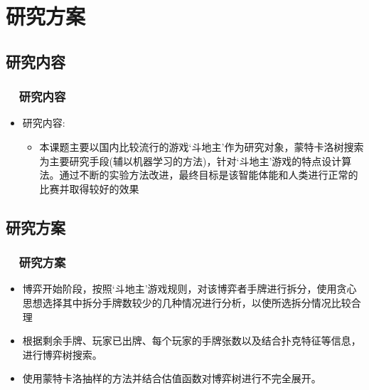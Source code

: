 \documentclass[11pt, CJK]{beamer}
\begin{document}
	\title[硕士中期检查答辩]{}
	
	\author[彭啟文]{(中期检查答辩报告){\vskip 23pt}指导教师：王以松~教授{\vskip 5pt}~~~~~答辩学生：彭啟文~~~~~~~~~~~~~~{\vskip 5pt}学~~~~号~：2017021834~~~}{\vskip 5pt}
	\date{2019-12-9}
	
	
	\begin{frame}
		\titlepage
	\end{frame}
	
	\section{研究方案}
		\subsection*{研究内容}
			\begin{frame}
				\frametitle{~~研究内容}
				\begin{itemize}
					\item 研究内容:
					\begin{itemize}
						\setlength{\baselineskip}{20pt}
						\item
						本课题主要以国内比较流行的游戏‘斗地主’作为研究对象，蒙特卡洛树搜索为主要研究手段(辅以机器学习的方法)，针对‘斗地主’游戏的特点设计算法。通过不断的实验方法改进，最终目标是该智能体能和人类进行正常的比赛并取得较好的效果
					\end{itemize}
				\end{itemize}
			\end{frame}
		\subsection*{研究方案}
			\begin{frame}
				\frametitle{~~研究方案}
				\begin{itemize}
					\setlength{\baselineskip}{16pt}
					\item 博弈开始阶段，按照‘斗地主’游戏规则，对该博弈者手牌进行拆分，使用贪心思想选择其中拆分手牌数较少的几种情况进行分析，以使所选拆分情况比较合理
					\vskip 8pt
					\item 根据剩余手牌、玩家已出牌、每个玩家的手牌张数以及结合扑克特征等信息，进行博弈树搜索。
					\vskip 8pt
					\item 使用蒙特卡洛抽样的方法并结合估值函数对博弈树进行不完全展开。
				\end{itemize}
			\end{frame}
	
\end{document}
